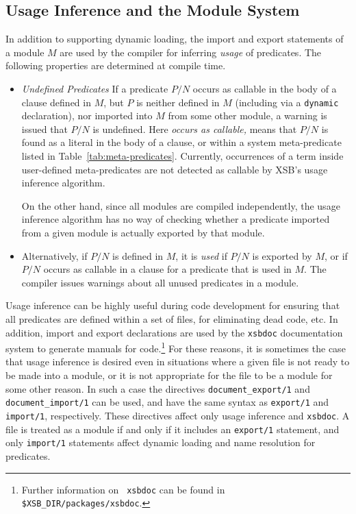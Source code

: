 \subsection{Usage Inference and the Module System} \label{sec:useinfer}
In addition to supporting dynamic loading, the import and export
statements of a module $M$ are used by the compiler for inferring {\em
  usage} of predicates.  The following properties are determined at
compile time.
\begin{itemize}
\item {\em Undefined Predicates} If a predicate $P/N$ occurs as
  callable in the body of a clause defined in $M$, but $P$ is neither
  defined in $M$ (including via a {\tt dynamic} declaration), nor
  imported into $M$ from some other module, a warning is issued that
  $P/N$ is undefined.  Here {\em occurs as callable,} means that
  $P/N$ is found as a literal in the body of a clause, or within a
  system meta-predicate listed in Table~\ref{tab:meta-predicates}.
  Currently, occurrences of a term inside user-defined meta-predicates
  are not detected as callable by XSB's usage inference algorithm.

    On the other hand, since all modules are compiled independently,
    the usage inference algorithm has no way of checking whether a
    predicate imported from a given module is actually exported by
    that module.
%
\item Alternatively, if $P/N$ is defined in $M$, it is {\em used} if
  $P/N$ is exported by $M$, or if $P/N$ occurs as callable in a clause
  for a predicate that is used in $M$.  The compiler issues warnings
  about all unused predicates in a module.  
\end{itemize}

Usage inference can be highly useful during code development for
ensuring that all predicates are defined within a set of files, for
eliminating dead code, etc.  In addition, import and export
declarations are used by the {\tt xsbdoc} documentation system to
generate manuals for code.\footnote{Further information on {\tt
xsbdoc} can be found in {\tt \$XSB\_DIR/packages/xsbdoc}.}  For these
reasons, it is sometimes the case that usage inference is desired even
in situations where a given file is not ready to be made into a
module, or it is not appropriate for the file to be a module for some
other reason.  In such a case the directives {\tt document\_export/1}
and {\tt document\_import/1} can be used, and have the same syntax as 
{\tt export/1} and {\tt import/1}, respectively.  These directives
affect only usage inference and {\tt xsbdoc}.  A file is treated as a
module if and only if it includes an {\tt export/1} statement, and
only {\tt import/1} statements affect dynamic loading and name
resolution for predicates.

